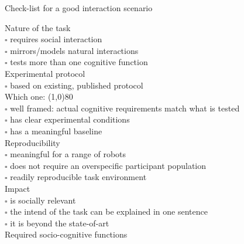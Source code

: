 \documentclass[compress]{beamer}
\begin{document}
\begin{frame}{Check-list for a good interaction scenario}
    \scriptsize
    \begin{multicols}{2}

        {\Medium Nature of the task}\\
        $\square$ requires social interaction\\
        $\square$ mirrors/models natural interactions\\
        $\square$ tests more than one cognitive function\\


        {\Medium Experimental protocol}\\
        $\square$ based on existing, published protocol\\
        Which one: \line(1,0){80}\\
        $\square$ well framed: actual cognitive requirements match what is tested\\
        $\square$ has clear experimental conditions\\
        $\square$ has a meaningful baseline\\

        {\Medium Reproducibility}\\
        $\square$ meaningful for a range of robots\\
        $\square$ does not require an overspecific participant population\\
        $\square$ readily reproducible task environment\\

        {\Medium Impact}\\
        $\square$ is socially relevant\\
        $\square$ the intend of the task can be explained in one sentence\\
        $\square$ it is beyond the state-of-art\\

        {\Medium Required socio-cognitive functions}


\end{multicols}
\end{frame}
\end{document}
